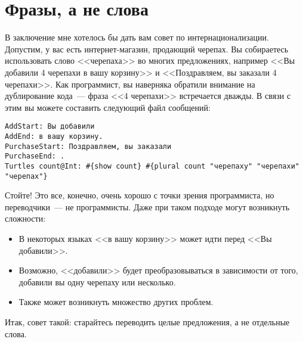 \section{Фразы, а не слова} %

В заключение мне хотелось бы дать вам совет по интернационализации. Допустим, у вас есть интернет-магазин, продающий черепах. Вы собираетесь использовать слово <<черепаха>> во многих предложениях, например <<Вы добавили 4 черепахи в вашу корзину>> и <<Поздравляем, вы заказали 4 черепахи>>. Как программист, вы наверняка обратили внимание на дублирование кода~--- фраза <<4 черепахи>> встречается дважды. В связи с этим вы можете составить следующий файл сообщений:

\begin{lstlisting}
AddStart: Вы добавили
AddEnd: в вашу корзину.
PurchaseStart: Поздравляем, вы заказали
PurchaseEnd: .
Turtles count@Int: #{show count} #{plural count "черепаху" "черепахи" "черепах"}
\end{lstlisting}

Стойте! Это все, конечно, очень хорошо с точки зрения программиста, но переводчики~--- не программисты. Даже при таком подходе могут возникнуть сложности:

\begin{itemize}
  \item В некоторых языках <<в вашу корзину>> может идти перед <<Вы добавили>>.
  \item Возможно, <<добавили>> будет преобразовываться в зависимости от того, добавили вы одну черепаху или несколько.
  \item Также может возникнуть множество других проблем. %
\end{itemize}

Итак, совет такой: старайтесь переводить целые предложения, а не отдельные слова.
